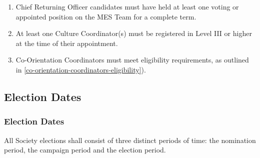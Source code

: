 \begin{enumerate}
 \item
  Chief Returning Officer candidates must have held at least one voting or appointed position on the MES Team for a complete term.
 \item
  At least one Culture Coordinator(s) must be registered in Level III or higher at the time of their appointment.
 \item
  Co-Orientation Coordinators must meet eligibility requirements, as outlined in \ref{co-orientation-coordinators-eligibility}).
\end{enumerate}

\subsection{Election Dates}
\label{election-dates}

\subsubsection{Election Dates}
\label{election-dates-1}
All Society elections shall consist of three distinct periods of time:
the nomination period, the campaign period and the election period.

